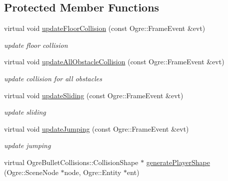 \subsection*{Protected Member Functions}
\begin{DoxyCompactItemize}
\item 
virtual void \hyperlink{class_n_c_t_u_1_1_player_obstacle_acde5e3264f8293ce3afc4f4c96908a2b}{update\+Floor\+Collision} (const Ogre\+::\+Frame\+Event \&evt)\hypertarget{class_n_c_t_u_1_1_player_obstacle_acde5e3264f8293ce3afc4f4c96908a2b}{}\label{class_n_c_t_u_1_1_player_obstacle_acde5e3264f8293ce3afc4f4c96908a2b}

\begin{DoxyCompactList}\small\item\em update floor collision \end{DoxyCompactList}\item 
virtual void \hyperlink{class_n_c_t_u_1_1_player_obstacle_a1d6130f01d590786fb1cf03c1c8cf9e9}{update\+All\+Obstacle\+Collision} (const Ogre\+::\+Frame\+Event \&evt)\hypertarget{class_n_c_t_u_1_1_player_obstacle_a1d6130f01d590786fb1cf03c1c8cf9e9}{}\label{class_n_c_t_u_1_1_player_obstacle_a1d6130f01d590786fb1cf03c1c8cf9e9}

\begin{DoxyCompactList}\small\item\em update collision for all obstacles \end{DoxyCompactList}\item 
virtual void \hyperlink{class_n_c_t_u_1_1_player_obstacle_a81e6539e32c20bbbe5b16fe50903ff3f}{update\+Sliding} (const Ogre\+::\+Frame\+Event \&evt)\hypertarget{class_n_c_t_u_1_1_player_obstacle_a81e6539e32c20bbbe5b16fe50903ff3f}{}\label{class_n_c_t_u_1_1_player_obstacle_a81e6539e32c20bbbe5b16fe50903ff3f}

\begin{DoxyCompactList}\small\item\em update sliding \end{DoxyCompactList}\item 
virtual void \hyperlink{class_n_c_t_u_1_1_player_obstacle_af6591f550147e25dee4f3589c8e5b16d}{update\+Jumping} (const Ogre\+::\+Frame\+Event \&evt)\hypertarget{class_n_c_t_u_1_1_player_obstacle_af6591f550147e25dee4f3589c8e5b16d}{}\label{class_n_c_t_u_1_1_player_obstacle_af6591f550147e25dee4f3589c8e5b16d}

\begin{DoxyCompactList}\small\item\em update jumping \end{DoxyCompactList}\item 
virtual Ogre\+Bullet\+Collisions\+::\+Collision\+Shape $\ast$ \hyperlink{class_n_c_t_u_1_1_player_obstacle_a19c1552e1c01674f499ded35e32a191d}{generate\+Player\+Shape} (Ogre\+::\+Scene\+Node $\ast$node, Ogre\+::\+Entity $\ast$ent)\hypertarget{class_n_c_t_u_1_1_player_obstacle_a19c1552e1c01674f499ded35e32a191d}{}\label{class_n_c_t_u_1_1_player_obstacle_a19c1552e1c01674f499ded35e32a191d}


\end{DoxyCompactItemize}
